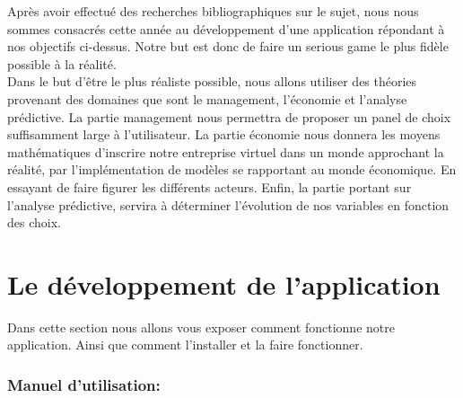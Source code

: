 Après avoir effectué des recherches bibliographiques sur le sujet, nous nous sommes consacrés cette année au développement d'une application répondant à nos objectifs ci-dessus. Notre but est donc de faire un serious game le plus fidèle possible à la réalité.\\
Dans le but d’être le plus réaliste possible, nous allons utiliser des théories provenant des domaines que sont le management, l’économie et l’analyse prédictive. La partie management nous permettra de proposer un panel de choix suffisamment large à l’utilisateur. La partie économie nous donnera les moyens mathématiques d’inscrire notre entreprise virtuel dans un monde approchant la réalité, par l'implémentation de modèles se rapportant au monde économique.
En essayant de faire figurer les différents acteurs. Enfin, la partie portant sur l’analyse
prédictive, servira à déterminer l’évolution de nos variables en fonction des choix.

















\clearpage























\clearpage



\part{Le développement de l'application}



\setcounter{section}{0}



Dans cette section nous allons vous exposer comment fonctionne notre application. Ainsi que comment l'installer et la faire fonctionner.



\section{Manuel d'utilisation:}



